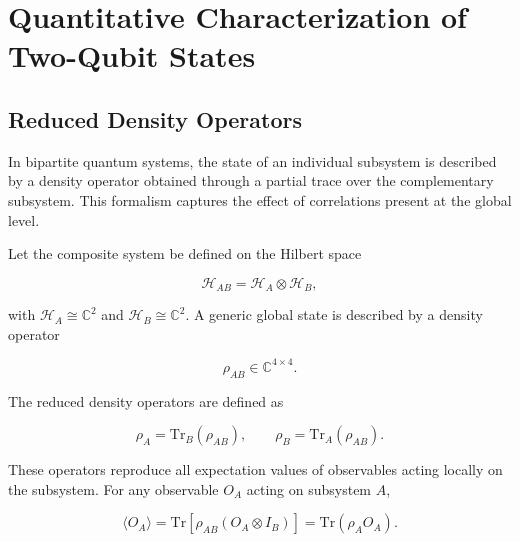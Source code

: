 
\chapter{Quantitative Characterization of Two-Qubit States}


\section{Reduced Density Operators}

In bipartite quantum systems, the state of an individual subsystem is described by a density operator obtained through a partial trace over the complementary subsystem. This formalism captures the effect of correlations present at the global level.

\medskip

Let the composite system be defined on the Hilbert space

\[
\mathcal{H}_{AB}
=
\mathcal{H}_A \otimes \mathcal{H}_B,
\]

with \( \mathcal{H}_A \cong \mathbb{C}^2 \) and \( \mathcal{H}_B \cong \mathbb{C}^2 \). A generic global state is described by a density operator

\[
\rho_{AB} \in \mathbb{C}^{4 \times 4}.
\]

The reduced density operators are defined as

\begin{equation}
\rho_A
=
\mathrm{Tr}_B(\rho_{AB}),
\qquad
\rho_B
=
\mathrm{Tr}_A(\rho_{AB}).
\label{eq:reduced_density_operators}
\end{equation}

\medskip

These operators reproduce all expectation values of observables acting locally on the subsystem. For any observable \( O_A \) acting on subsystem \( A \),

\begin{equation}
\langle O_A \rangle
=
\mathrm{Tr}\!\left[
\rho_{AB}
\left(
O_A \otimes I_B
\right)
\right]
=
\mathrm{Tr}(\rho_A O_A).
\label{eq:local_expectation_reduced_density}
\end{equation}

